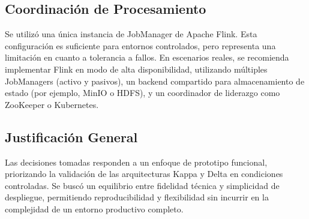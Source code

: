 \subsection{Coordinación de Procesamiento}
Se utilizó una única instancia de JobManager de Apache Flink. Esta configuración es suficiente para entornos controlados, pero representa una limitación en cuanto a tolerancia a fallos. 
En escenarios reales, se recomienda implementar Flink en modo de alta disponibilidad, utilizando múltiples JobManagers (activo y pasivos), un backend compartido para almacenamiento de estado (por ejemplo, MinIO o HDFS), 
y un coordinador de liderazgo como ZooKeeper o Kubernetes.

\subsection{Justificación General}
Las decisiones tomadas responden a un enfoque de prototipo funcional, priorizando la validación de las arquitecturas Kappa y Delta en condiciones controladas. 
Se buscó un equilibrio entre fidelidad técnica y simplicidad de despliegue, permitiendo reproducibilidad y flexibilidad sin incurrir en la complejidad de un entorno productivo completo.
